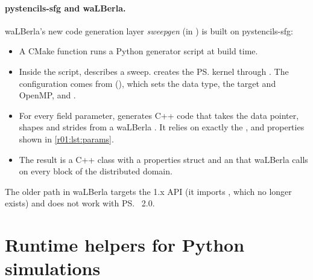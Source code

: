 \paragraph{pystencils-sfg and waLBerla.}
waLBerla's new code generation layer \emph{sweepgen} (in
) is built on pystencils-sfg:
\begin{itemize}
  \item A CMake function  runs
        a Python generator script at build time.
  \item Inside the script,  describes a sweep.
         creates the \ps{} kernel through
        . The
        configuration comes from 
        (), which sets the data type, the target and
        OpenMP, and .
  \item For every field parameter,  generates
        C++ code that takes the data pointer, shapes and strides from a waLBerla
        . It relies on exactly the ,
         and  properties shown in \cref{r01:lst:params}.
  \item The result is a C++ class with a properties struct and an  that
        waLBerla calls on every block of the distributed domain.
\end{itemize}
The older  path in waLBerla targets the 1.x API (it
imports , which no longer exists) and
does not work with \ps{}~2.0.

\section{Runtime helpers for Python simulations}

